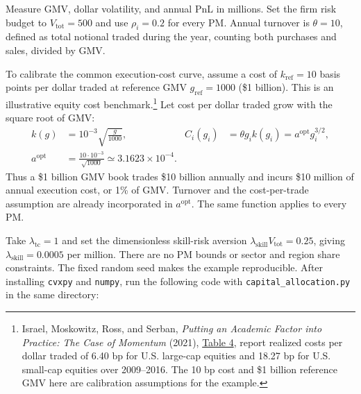 \documentclass[11pt]{gappyarticle}
\begin{document}
Measure GMV, dollar volatility, and annual PnL in millions. Set the firm
risk budget to $V_{\mathrm{tot}}=500$ and use $\rho_i=0.2$ for every PM.
Annual turnover is $\theta=10$, defined as total notional traded during
the year, counting both purchases and sales, divided by GMV.

To calibrate the common execution-cost curve, assume a cost of
$k_{\mathrm{ref}}=10$ basis points per dollar traded at reference GMV
$g_{\mathrm{ref}}=1000$ (\$1 billion). This is an illustrative equity
cost benchmark.\footnote{Israel, Moskowitz, Ross, and Serban,
\emph{Putting an Academic Factor into Practice: The Case of Momentum}
(2021), \href{https://spinup-000d1a-wp-offload-media.s3.amazonaws.com/faculty/wp-content/uploads/sites/3/2021/08/Putting-and-Academic-Factor-Into-Practice.pdf}{Table 4},
report realized costs per dollar traded of 6.40 bp for U.S. large-cap
equities and 18.27 bp for U.S. small-cap equities over 2009--2016.
The 10 bp cost and \$1 billion reference GMV here are calibration
assumptions for the example.}
Let cost per dollar traded grow with the square root of GMV:
\begin{align}
    k(g)&=10^{-3}\sqrt{\frac{g}{1000}},&
    C_i(g_i)&=\theta g_i k(g_i)=a^{\mathrm{opt}}g_i^{3/2},\\
    a^{\mathrm{opt}}&=\frac{10\cdot10^{-3}}{\sqrt{1000}}
                       \simeq3.1623\times10^{-4}.
\end{align}
Thus a \$1 billion GMV book trades \$10 billion annually and incurs
\$10 million of annual execution cost, or 1\% of GMV. Turnover and the
cost-per-trade assumption are already incorporated in $a^{\mathrm{opt}}$.
The same function applies to every PM.

Take $\lambda_{\mathrm{tc}}=1$ and set the dimensionless skill-risk
aversion $\lambda_{\mathrm{skill}}V_{\mathrm{tot}}=0.25$, giving
$\lambda_{\mathrm{skill}}=0.0005$ per million. There are no PM bounds or
sector and region share constraints. The fixed random seed makes the
example reproducible. After installing \texttt{cvxpy} and \texttt{numpy},
run the following code with \texttt{capital\_allocation.py} in the same
directory:

\end{document}
